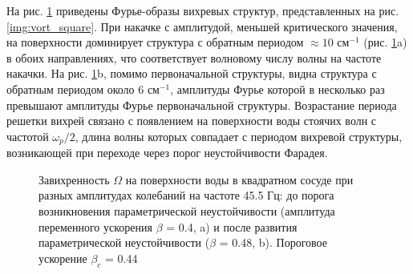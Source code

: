 На рис. \ref{img:fft_square} приведены Фурье-образы вихревых структур, представленных на рис. \ref{img:vort_square}. При накачке с амплитудой, меньшей критического значения, на поверхности доминирует структура с обратным периодом $\approx 10$ см$^{-1}$ (рис. \ref{img:fft_square}a) в обоих направлениях, что соответствует волновому числу волны на частоте накачки. На рис. \ref{img:fft_square}b, помимо первоначальной структуры, видна структура с обратным периодом около 6 см$^{-1}$, амплитуды Фурье которой в несколько раз превышают амплитуды Фурье первоначальной структуры. Возрастание периода решетки вихрей связано с появлением на поверхности воды стоячих волн с частотой $\omega_p/2$, длина волны которых совпадает с периодом вихревой структуры, возникающей при переходе через порог неустойчивости Фарадея. 


\begin{figure}[ht]
  \begin{minipage}[ht]{0.49\linewidth}
  \end{minipage}
  \hfill
  \begin{minipage}[ht]{0.49\linewidth}
  \end{minipage}
  \caption{Завихренность $\Omega$ на поверхности воды в квадратном сосуде при разных амплитудах колебаний на частоте 45.5 Гц: до порога возникновения параметрической неустойчивости (амплитуда переменного ускорения $\beta$ = 0.4, a) и после развития параметрической неустойчивости ($\beta$ = 0.48, b). Пороговое ускорение $\beta_c$ = 0.44}
  \label{img:fft_square}  
\end{figure}

